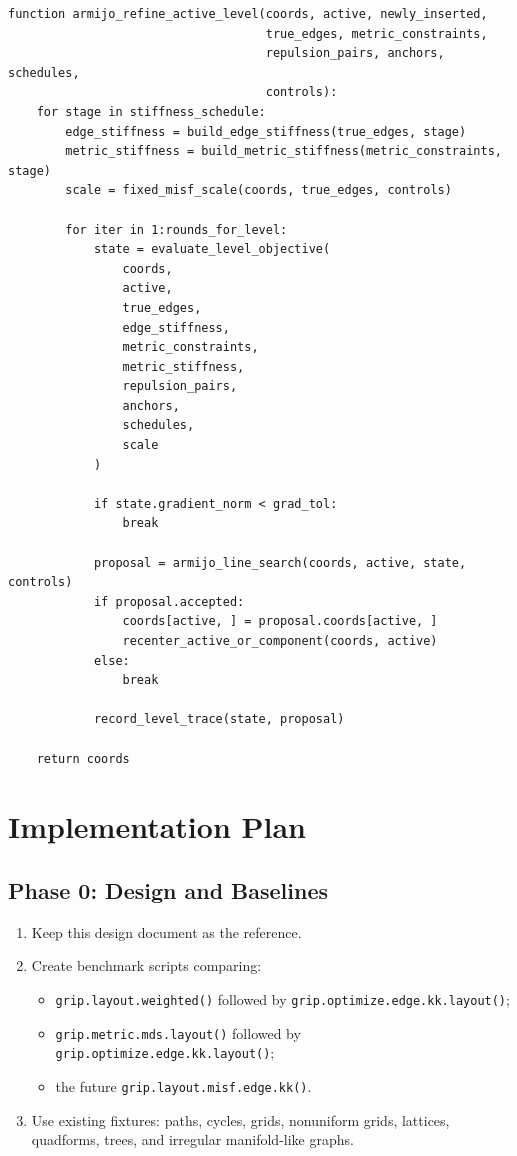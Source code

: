 \documentclass[11pt]{article}
\newcommand{\Rfunc}[1]{\texttt{#1}}
\begin{document}
\begin{verbatim}
function armijo_refine_active_level(coords, active, newly_inserted,
                                    true_edges, metric_constraints,
                                    repulsion_pairs, anchors, schedules,
                                    controls):
    for stage in stiffness_schedule:
        edge_stiffness = build_edge_stiffness(true_edges, stage)
        metric_stiffness = build_metric_stiffness(metric_constraints, stage)
        scale = fixed_misf_scale(coords, true_edges, controls)

        for iter in 1:rounds_for_level:
            state = evaluate_level_objective(
                coords,
                active,
                true_edges,
                edge_stiffness,
                metric_constraints,
                metric_stiffness,
                repulsion_pairs,
                anchors,
                schedules,
                scale
            )

            if state.gradient_norm < grad_tol:
                break

            proposal = armijo_line_search(coords, active, state, controls)
            if proposal.accepted:
                coords[active, ] = proposal.coords[active, ]
                recenter_active_or_component(coords, active)
            else:
                break

            record_level_trace(state, proposal)

    return coords
\end{verbatim}

\section{Implementation Plan}

\subsection{Phase 0: Design and Baselines}

\begin{enumerate}[leftmargin=2em]
  \item Keep this design document as the reference.
  \item Create benchmark scripts comparing:
  \begin{itemize}
    \item \Rfunc{grip.layout.weighted()} followed by
    \Rfunc{grip.optimize.edge.kk.layout()};
    \item \Rfunc{grip.metric.mds.layout()} followed by
    \Rfunc{grip.optimize.edge.kk.layout()};
    \item the future \Rfunc{grip.layout.misf.edge.kk()}.
  \end{itemize}
  \item Use existing fixtures: paths, cycles, grids, nonuniform grids, lattices,
  quadforms, trees, and irregular manifold-like graphs.
\end{enumerate}
\end{document}
